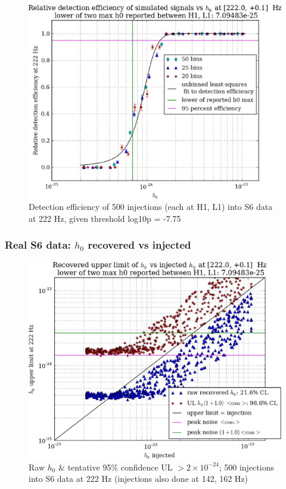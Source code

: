 \begin{figure}
\begin{center}
\includegraphics[width=0.4\paperwidth,height=0.2\paperheight]{plots/detectionEfficiencyh0-222-0Hz.eps}
\caption{
Detection efficiency of 500 injections (each at H1, L1) into
S6 data at 222 Hz, given threshold log10p = -7.75}
\end{center}
\end{figure}

\subsubsection{Real S6 data: $h_0$ recovered vs injected}

\begin{figure}
\begin{center}
\includegraphics[width=0.4\paperwidth,height=0.2\paperheight]{plots/h0UL-vs-h0injected-222-0Hz.eps}
\caption{
Raw $h_0$ \& tentative 95\% confidence UL $>2\times10^{-24}$; 500 injections
into S6 data at 222 Hz (injections also done at 142, 162 Hz)}
\end{center}
\end{figure}

